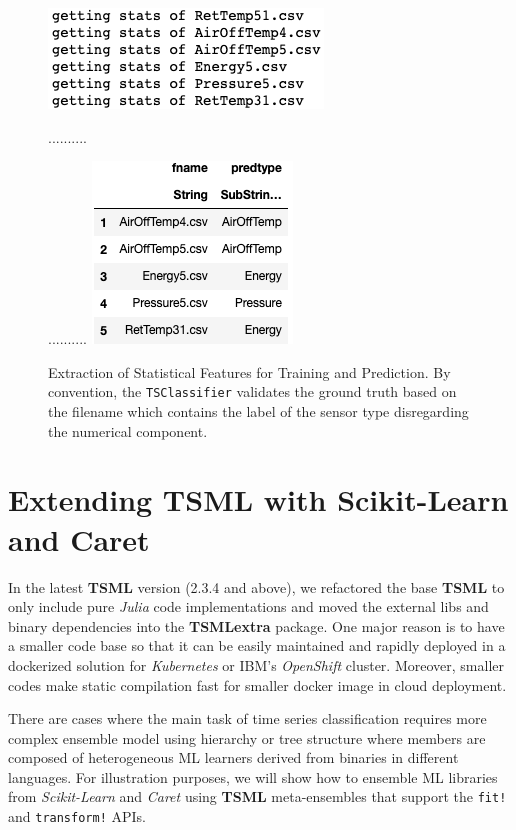 \documentclass{juliacon}
\begin{document}
\begin{figure}[htbp]
   \centering
   \includegraphics[width=0.5\columnwidth]{tscl1.png} %
   
   ..........
   
   ..........
   \vskip 2pt
   \includegraphics[width=0.4\columnwidth]{tscl2.png} %
   \caption{Extraction of Statistical Features for Training and Prediction. By convention, the \texttt{TSClassifier} validates the ground truth based on the filename which contains the label of the sensor type disregarding the numerical component.}
   \label{fig:tcl}
\end{figure}

\section{Extending TSML with Scikit-Learn and Caret}
In the latest \textbf{TSML} version (2.3.4 and above), 
we refactored the base \textbf{TSML}
to only include pure \emph{Julia} code implementations and moved the external libs and binary dependencies into the \textbf{TSMLextra} package. 
One major reason is to have a smaller code base so that it can be easily
maintained and rapidly deployed in a dockerized solution for \emph{Kubernetes} or IBM's \emph{OpenShift} cluster. Moreover, smaller codes make
static compilation fast for smaller docker image  
in cloud deployment. 

\vskip 6pt

There are cases where the main task of time series classification 
requires more complex ensemble model using hierarchy or tree structure where 
members are composed of heterogeneous ML learners derived from binaries in 
different languages. For illustration purposes, we will show how to 
ensemble ML libraries from \emph{Scikit-Learn} and \emph{Caret} using \textbf{TSML} meta-ensembles that support the  \texttt{fit!} and \texttt{transform!} APIs.
\end{document}
